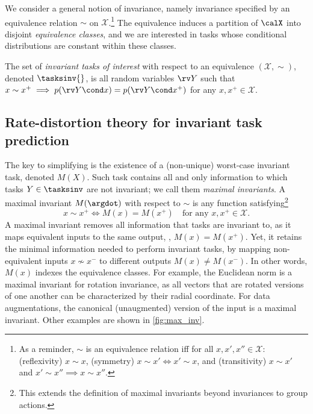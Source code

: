 \documentclass[final]{article}
\begin{document}
We consider a general notion of invariance, namely invariance specified by an equivalence relation $\sim$ on $\mathcal{X}$.\footnote{As a reminder, $\sim$ is an equivalence relation iff for all $x,x',x'' \in \mathcal{X}$: (reflexivity) $x \sim x$, (symmetry) $x \sim x' \iff x' \sim x$, and (transitivity) $x \sim x'$ and $x' \sim x''  \implies   x \sim x''$.
}
 The equivalence induces a partition of $\calX$ into disjoint \textit{equivalence classes}, and we are interested in  tasks whose conditional distributions are constant within these classes.
\begin{definition} \label{def:invariant_tasks_interest:main}
The set of \textit{invariant tasks of interest} with respect to an  equivalence $(\mathcal X, \sim)$, denoted $\tasksinv{}$, is all random variables $\rv Y$ such that $x \sim x^+ \implies p(\rv Y \cond x ) = p(\rv Y \cond x^+)$ for any $x,x^+ \in \mathcal{X}$. 
\end{definition}



\subsection{Rate-distortion theory for invariant task prediction} 

The key to simplifying \disttextinv{} is the existence of a (non-unique) worst-case invariant task, denoted $M(X)$.
Such task contains all and only information to which tasks $Y\in\tasksinv$ are not invariant; we call them \textit{maximal invariants}.
A maximal invariant $M(\argdot)$ with respect to $\sim$ is any function satisfying\footnote{
This extends the definition of maximal invariants \cite{eaton_group_1989} beyond invariances to group actions.
}
\begin{equation}\label{eqn:max_invariant}
x \sim x^+ \iff M(x) = M(x^+) \quad \text{for any  $x,x^+ \in \mathcal{X}$.}
\end{equation}
A maximal invariant removes all information that tasks are invariant to, as it maps equivalent
inputs to the same output, \ie, $M(x)=M(x^+)$.
Yet, it retains the minimal information needed to perform invariant tasks, by mapping non-equivalent inputs $x \not \sim x^-$ to different outputs $M(x) \neq M(x^-)$.
In other words, $M(x)$ indexes the equivalence classes. 
For example, the Euclidean norm is a maximal invariant for rotation invariance, as all vectors that are rotated versions of one another can be characterized by their radial coordinate. 
For data augmentations, the canonical (unaugmented) version of the input is a maximal invariant. Other examples are shown in  \cref{fig:max_inv}.
\end{document}
